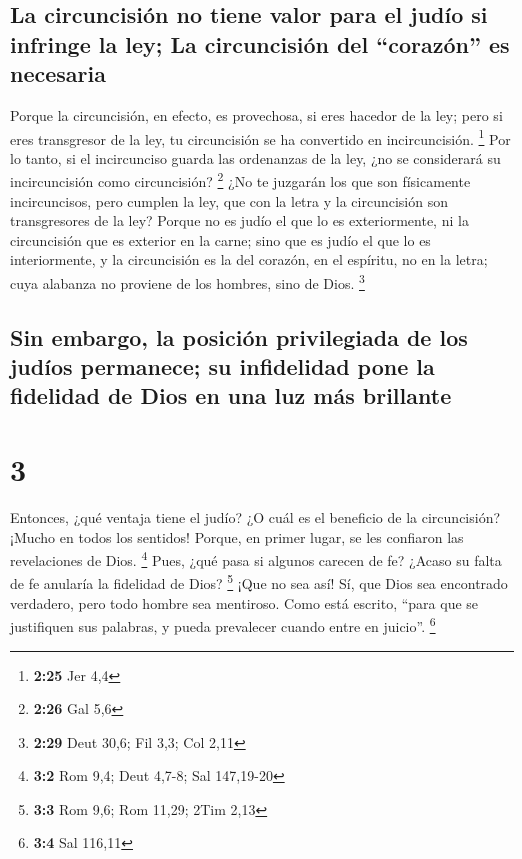\hypertarget{la-circuncisiuxf3n-no-tiene-valor-para-el-juduxedo-si-infringe-la-ley-la-circuncisiuxf3n-del-corazuxf3n-es-necesaria}{%
\subsection{La circuncisión no tiene valor para el judío si infringe la
ley; La circuncisión del ``corazón'' es
necesaria}\label{la-circuncisiuxf3n-no-tiene-valor-para-el-juduxedo-si-infringe-la-ley-la-circuncisiuxf3n-del-corazuxf3n-es-necesaria}}

 Porque la circuncisión, en efecto, es provechosa, si
eres hacedor de la ley; pero si eres transgresor de la ley, tu
circuncisión se ha convertido en incircuncisión. \footnote{\textbf{2:25}
  Jer 4,4}  Por lo tanto, si el incircunciso guarda las
ordenanzas de la ley, ¿no se considerará su incircuncisión como
circuncisión? \footnote{\textbf{2:26} Gal 5,6}  ¿No te
juzgarán los que son físicamente incircuncisos, pero cumplen la ley, que
con la letra y la circuncisión son transgresores de la ley?
 Porque no es judío el que lo es exteriormente, ni la
circuncisión que es exterior en la carne;  sino que es
judío el que lo es interiormente, y la circuncisión es la del corazón,
en el espíritu, no en la letra; cuya alabanza no proviene de los
hombres, sino de Dios. \footnote{\textbf{2:29} Deut 30,6; Fil 3,3; Col
  2,11}

\hypertarget{sin-embargo-la-posiciuxf3n-privilegiada-de-los-juduxedos-permanece-su-infidelidad-pone-la-fidelidad-de-dios-en-una-luz-muxe1s-brillante}{%
\subsection{Sin embargo, la posición privilegiada de los judíos
permanece; su infidelidad pone la fidelidad de Dios en una luz más
brillante}\label{sin-embargo-la-posiciuxf3n-privilegiada-de-los-juduxedos-permanece-su-infidelidad-pone-la-fidelidad-de-dios-en-una-luz-muxe1s-brillante}}

\hypertarget{section-2}{%
\section{3}\label{section-2}}

 Entonces, ¿qué ventaja tiene el judío? ¿O cuál es el
beneficio de la circuncisión?  ¡Mucho en todos los
sentidos! Porque, en primer lugar, se les confiaron las revelaciones de
Dios. \footnote{\textbf{3:2} Rom 9,4; Deut 4,7-8; Sal 147,19-20}
 Pues, ¿qué pasa si algunos carecen de fe? ¿Acaso su falta
de fe anularía la fidelidad de Dios? \footnote{\textbf{3:3} Rom 9,6; Rom
  11,29; 2Tim 2,13}  ¡Que no sea así! Sí, que Dios sea
encontrado verdadero, pero todo hombre sea mentiroso. Como está escrito,
``para que se justifiquen sus palabras, y pueda prevalecer cuando entre
en juicio''. \footnote{\textbf{3:4} Sal 116,11}

